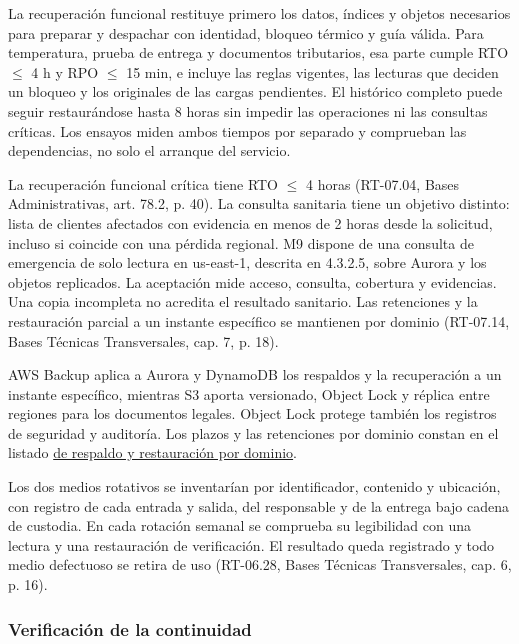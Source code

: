 La recuperación funcional restituye primero los datos, índices y objetos necesarios para preparar y despachar con identidad, bloqueo térmico y guía válida. Para temperatura, prueba de entrega y documentos tributarios, esa parte cumple RTO $\leq$ 4 h y RPO $\leq$ 15 min, e incluye las reglas vigentes, las lecturas que deciden un bloqueo y los originales de las cargas pendientes. El histórico completo puede seguir restaurándose hasta 8 horas sin impedir las operaciones ni las consultas críticas. Los ensayos miden ambos tiempos por separado y comprueban las dependencias, no solo el arranque del servicio.

La recuperación funcional crítica tiene RTO $\leq$ 4 horas (RT-07.04, Bases Administrativas, art. 78.2, p. 40). La consulta sanitaria tiene un objetivo distinto: lista de clientes afectados con evidencia en menos de 2 horas desde la solicitud, incluso si coincide con una pérdida regional. M9 dispone de una consulta de emergencia de solo lectura en us-east-1, descrita en 4.3.2.5, sobre Aurora y los objetos replicados. La aceptación mide acceso, consulta, cobertura y evidencias. Una copia incompleta no acredita el resultado sanitario. Las retenciones y la restauración parcial a un instante específico se mantienen por dominio (RT-07.14, Bases Técnicas Transversales, cap. 7, p. 18).

AWS Backup aplica a Aurora y DynamoDB los respaldos y la recuperación a un instante específico, mientras S3 aporta versionado, Object Lock y réplica entre regiones para los documentos legales. Object Lock protege también los registros de seguridad y auditoría. Los plazos y las retenciones por dominio constan en el listado \hyperref[tab:jd12]{de respaldo y restauración por dominio}.

Los dos medios rotativos se inventarían por identificador, contenido y ubicación, con registro de cada entrada y salida, del responsable y de la entrega bajo cadena de custodia. En cada rotación semanal se comprueba su legibilidad con una lectura y una restauración de verificación. El resultado queda registrado y todo medio defectuoso se retira de uso (RT-06.28, Bases Técnicas Transversales, cap. 6, p. 16).

\subsubsection{Verificación de la continuidad}
\label{sub:6-verificacion-de-la-continuidad}


